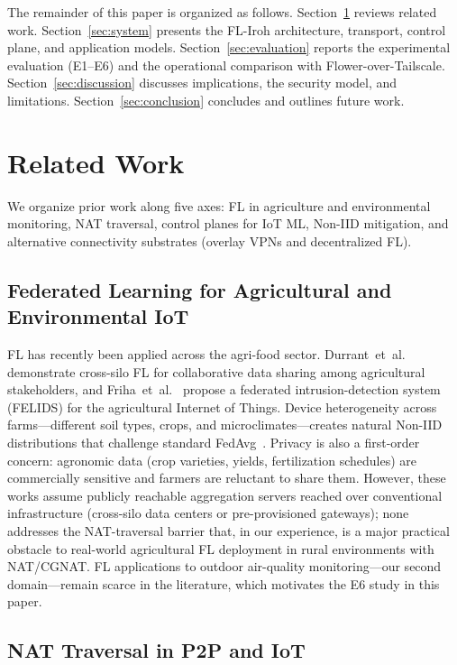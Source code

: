 \documentclass[a4paper,fleqn]{cas-dc}
\begin{document}
The remainder of this paper is organized as follows. Section~\ref{sec:related} reviews related work. Section~\ref{sec:system} presents the FL-Iroh architecture, transport, control plane, and application models. Section~\ref{sec:evaluation} reports the experimental evaluation (E1--E6) and the operational comparison with Flower-over-Tailscale. Section~\ref{sec:discussion} discusses implications, the security model, and limitations. Section~\ref{sec:conclusion} concludes and outlines future work.

\section{Related Work}
\label{sec:related}

We organize prior work along five axes: FL in agriculture and environmental monitoring, NAT traversal, control planes for IoT ML, Non-IID mitigation, and alternative connectivity substrates (overlay VPNs and decentralized FL).

\subsection{Federated Learning for Agricultural and Environmental IoT}

FL has recently been applied across the agri-food sector. Durrant~et~al.~\cite{durrant2022} demonstrate cross-silo FL for collaborative data sharing among agricultural stakeholders, and Friha~et~al.~\cite{friha2022} propose a federated intrusion-detection system (FELIDS) for the agricultural Internet of Things. Device heterogeneity across farms---different soil types, crops, and microclimates---creates natural Non-IID distributions that challenge standard FedAvg~\cite{mcmahan2017}. Privacy is also a first-order concern: agronomic data (crop varieties, yields, fertilization schedules) are commercially sensitive and farmers are reluctant to share them. However, these works assume publicly reachable aggregation servers reached over conventional infrastructure (cross-silo data centers or pre-provisioned gateways); none addresses the NAT-traversal barrier that, in our experience, is a major practical obstacle to real-world agricultural FL deployment in rural environments with NAT/CGNAT. FL applications to outdoor air-quality monitoring---our second domain---remain scarce in the literature, which motivates the E6 study in this paper.

\subsection{NAT Traversal in P2P and IoT}
\end{document}
